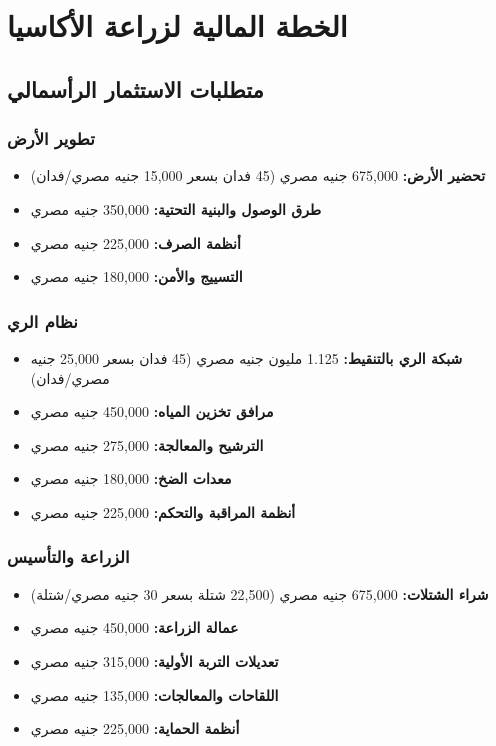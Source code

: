 \section{الخطة المالية لزراعة الأكاسيا}

\subsection{متطلبات الاستثمار الرأسمالي}

\subsubsection{تطوير الأرض}
\begin{itemize}
    \item \textbf{تحضير الأرض:} 675,000 جنيه مصري (45 فدان بسعر 15,000 جنيه مصري/فدان)
    \item \textbf{طرق الوصول والبنية التحتية:} 350,000 جنيه مصري
    \item \textbf{أنظمة الصرف:} 225,000 جنيه مصري
    \item \textbf{التسييج والأمن:} 180,000 جنيه مصري
\end{itemize}

\subsubsection{نظام الري}
\begin{itemize}
    \item \textbf{شبكة الري بالتنقيط:} 1.125 مليون جنيه مصري (45 فدان بسعر 25,000 جنيه مصري/فدان)
    \item \textbf{مرافق تخزين المياه:} 450,000 جنيه مصري
    \item \textbf{الترشيح والمعالجة:} 275,000 جنيه مصري
    \item \textbf{معدات الضخ:} 180,000 جنيه مصري
    \item \textbf{أنظمة المراقبة والتحكم:} 225,000 جنيه مصري
\end{itemize}

\subsubsection{الزراعة والتأسيس}
\begin{itemize}
    \item \textbf{شراء الشتلات:} 675,000 جنيه مصري (22,500 شتلة بسعر 30 جنيه مصري/شتلة)
    \item \textbf{عمالة الزراعة:} 450,000 جنيه مصري
    \item \textbf{تعديلات التربة الأولية:} 315,000 جنيه مصري
    \item \textbf{اللقاحات والمعالجات:} 135,000 جنيه مصري
    \item \textbf{أنظمة الحماية:} 225,000 جنيه مصري
\end{itemize}

